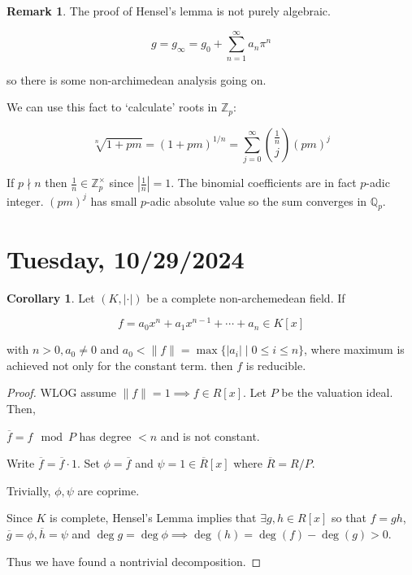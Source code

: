 \documentclass[openany]{amsbook}
\numberwithin{section}{chapter}
\theoremstyle{definition}
\newtheorem*{remark}{Remark}
\newtheorem{corollary}[theorem]{Corollary}
\begin{document}
\begin{remark}
    The proof of Hensel's lemma is not purely algebraic.

    \[
        g = g_\infty = g_0 + \sum_{n=1}^{\infty} a_n \pi^n
    \]

    so there is some non-archimedean analysis going on.

    We can use this fact to `calculate' roots in \(\mathbb{Z}_p\):

    \[
        \sqrt[n]{1+pm} = (1+pm)^{1 / n} = \sum_{j=0}^{\infty} \binom{\frac{1}{n}}{j}(pm)^j
    \]

    If \(p\nmid n\) then \(\frac{1}{n} \in \mathbb{Z}_p^\times\) since \(\left\vert \frac{1}{n} \right\vert = 1\). The binomial coefficients are in fact \(p\)-adic integer. \((pm)^j\) has small \(p\)-adic absolute value so the sum converges in \(\mathbb{Q}_p\).
\end{remark}

\section*{Tuesday, 10/29/2024}

\begin{corollary}
    Let \((K, \vert \cdot \vert )\) be a complete non-archemedean field. If

    \[
        f = a_0 x^n + a_1 x^{n-1} + \cdots + a_n \in K[x] 
    \]

    with \(n > 0, a_0 \neq 0\) and \(a_0 < \lVert f \rVert = \max \{ \vert a_i \vert \mid 0 \leq i \leq n \} \), where maximum is achieved not only for the constant term. then \(f\) is reducible.
\end{corollary}

\begin{proof}
    WLOG assume \(\lVert f \rVert = 1 \implies f\in R[x]\). Let \(P\) be the valuation ideal. Then,

    \(\overline{f} = f \mod P\) has degree \(< n\) and is not constant.

    Write \(\overline{f} = \overline{f} \cdot 1\). Set \(\phi = \overline{f}\) and \(\psi = 1 \in \overline{R}[x]\) where \(\overline{R} = R / P\).
    
    Trivially, \(\phi, \psi\) are coprime.

    Since \(K\) is complete, Hensel's Lemma implies that \(\exists g, h \in R[x]\) so that \(f = gh\), \(\overline{g} = \phi , \overline{h} = \psi\) and \(\deg g=\deg \phi \implies \deg(h) = \deg(f) - \deg(g) > 0\).

    Thus we have found a nontrivial decomposition.
\end{proof}
\end{document}
